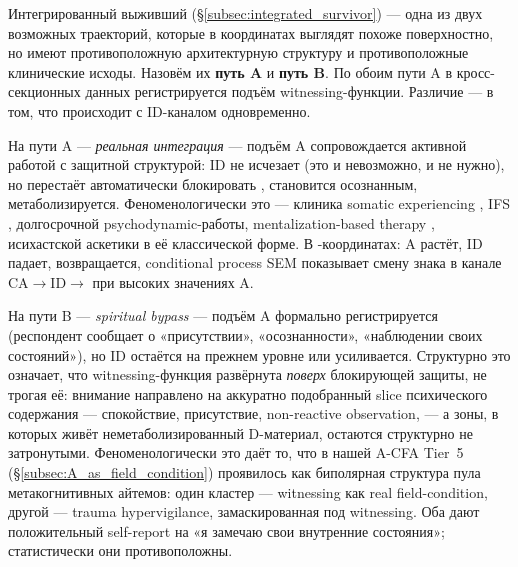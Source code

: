 Интегрированный выживший (§\ref{subsec:integrated_survivor}) --- одна из двух возможных траекторий, которые в координатах \DEIC{} выглядят похоже поверхностно, но имеют противоположную архитектурную структуру и противоположные клинические исходы. Назовём их \textbf{путь A} и \textbf{путь B}. По обоим пути A в кросс-секционных данных регистрируется подъём witnessing-функции. Различие --- в том, что происходит с ID-каналом одновременно.

На пути A --- \emph{реальная интеграция} --- подъём A сопровождается активной работой с защитной структурой: ID не исчезает (это и невозможно, и не нужно), но перестаёт автоматически блокировать \EAF{}, становится осознанным, метаболизируется. Феноменологически это --- клиника somatic experiencing \citep{levine2015}, IFS \citep{schwartz1995}, долгосрочной psychodynamic-работы, mentalization-based therapy \citep{fonagy2008}, исихастской аскетики в её классической форме. В \DEIC{}-координатах: A растёт, ID падает, \EAF{} возвращается, conditional process SEM показывает смену знака в канале CA$\to$ID$\to$\EAF{} при высоких значениях A.

На пути B --- \emph{spiritual bypass} --- подъём A формально регистрируется (респондент сообщает о «присутствии», «осознанности», «наблюдении своих состояний»), но ID остаётся на прежнем уровне или усиливается. Структурно это означает, что witnessing-функция развёрнута \emph{поверх} блокирующей защиты, не трогая её: внимание направлено на аккуратно подобранный slice психического содержания --- спокойствие, присутствие, non-reactive observation, --- а зоны, в которых живёт неметаболизированный D-материал, остаются структурно не затронутыми. Феноменологически это даёт то, что в нашей A-CFA Tier~5 (§\ref{subsec:A_as_field_condition}) проявилось как биполярная структура пула метакогнитивных айтемов: один кластер --- witnessing как real field-condition, другой --- trauma hypervigilance, замаскированная под witnessing. Оба дают положительный self-report на «я замечаю свои внутренние состояния»; статистически они противоположны.

